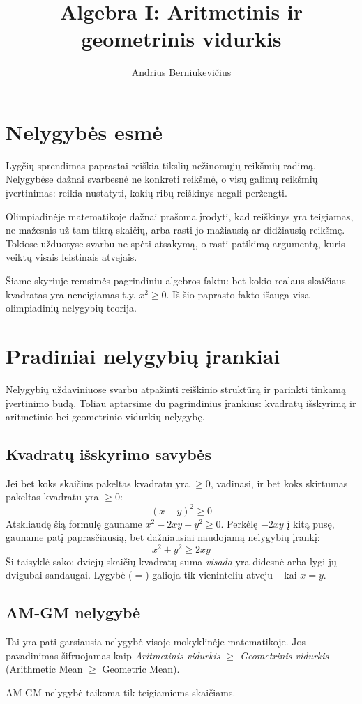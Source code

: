 \documentclass[11pt,a4paper]{scrartcl}
\title{Algebra I: Aritmetinis ir geometrinis vidurkis}
\author{Andrius Berniukevičius}
\begin{document}
\maketitle

\section{Nelygybės esmė}

Lygčių sprendimas paprastai reiškia tikslių nežinomųjų reikšmių radimą. Nelygybėse dažnai svarbesnė ne konkreti reikšmė, o visų galimų reikšmių įvertinimas: reikia nustatyti, kokių ribų reiškinys negali peržengti.

Olimpiadinėje matematikoje dažnai prašoma įrodyti, kad reiškinys yra teigiamas, ne mažesnis už tam tikrą skaičių, arba rasti jo mažiausią ar didžiausią reikšmę. Tokiose užduotyse svarbu ne spėti atsakymą, o rasti patikimą argumentą, kuris veiktų visais leistinais atvejais.

Šiame skyriuje remsimės pagrindiniu algebros faktu: bet kokio realaus skaičiaus kvadratas yra neneigiamas t.y. $x^2 \ge 0$. Iš šio paprasto fakto išauga visa olimpiadinių nelygybių teorija.


\section{Pradiniai nelygybių įrankiai}

Nelygybių uždaviniuose svarbu atpažinti reiškinio struktūrą ir parinkti tinkamą įvertinimo būdą. Toliau aptarsime du pagrindinius įrankius: kvadratų išskyrimą ir aritmetinio bei geometrinio vidurkių nelygybę.

\subsection{Kvadratų išskyrimo savybės}
Jei bet koks skaičius pakeltas kvadratu yra $\ge 0$, vadinasi, ir bet koks skirtumas pakeltas kvadratu yra $\ge 0$:
$$ (x - y)^2 \ge 0 $$
Atskliaudę šią formulę gauname $x^2 - 2xy + y^2 \ge 0$. Perkėlę $-2xy$ į kitą pusę, gauname patį paprasčiausią, bet dažniausiai naudojamą nelygybių įrankį:
$$ {x^2 + y^2 \ge 2xy} $$
Ši taisyklė sako: dviejų skaičių kvadratų suma \textit{visada} yra didesnė arba lygi jų dvigubai sandaugai. Lygybė ($=$) galioja tik vieninteliu atveju – kai $x = y$.

\subsection{AM-GM nelygybė}
Tai yra pati garsiausia nelygybė visoje mokyklinėje matematikoje. Jos pavadinimas šifruojamas kaip \textit{Aritmetinis vidurkis $\ge$ Geometrinis vidurkis} (Arithmetic Mean $\ge$ Geometric Mean).
\begin{remark*}
AM-GM nelygybė taikoma tik teigiamiems skaičiams.
\end{remark*}
\end{document}
